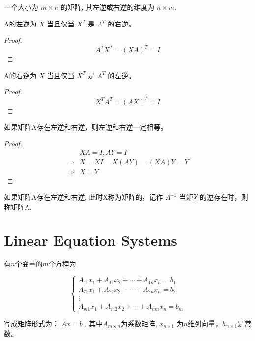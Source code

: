 \begin{theorem}
一个大小为 $ m \times n $ 的矩阵, 其左逆或右逆的维度为 $ n \times m $.
\end{theorem}


\begin{theorem}
    A的左逆为 $ X $ 当且仅当 $ X^{T} $ 是 $ A^{T} $ 的右逆。
\end{theorem}

\begin{proof}
    $$
A^{T} X^{T}=(X A)^{T}=I
$$
\end{proof}

\begin{theorem}
    A的右逆为 $ X $ 当且仅当 $ X^{T} $ 是 $ A^{T} $ 的左逆。
\end{theorem}

\begin{proof}
    $$
X^{T} A^{T}=(A X)^{ {T}}=I
$$
\end{proof}

\begin{theorem}
    如果矩阵A存在左逆和右逆，则左逆和右逆一定相等。
\end{theorem}

\begin{proof}
    $$
    \begin{aligned}
    &X A=I, A Y=I  \\
    \Rightarrow&  X=X I=X(A Y)=(X A) Y=Y \\
    \Rightarrow& X=Y
    \end{aligned}
$$
\end{proof}

\begin{definition}[逆 $A^{-1}$]
    如果矩阵A存在左逆和右逆, 此时X称为矩阵的，记作 $ A^{-1} $ 当矩阵的逆存在时，则称矩阵A.
\end{definition}

\section{Linear Equation Systems}

\begin{definition}
    有$n$个变量的$m$个方程为

    $$ \left\{\begin{array}{c}A_{11} x_{1}+A_{12} x_{2}+\cdots+A_{1 n} x_{n}=b_{1} \\ A_{21} x_{1}+A_{22} x_{2}+\cdots+A_{2 n} x_{n}=b_{2} \\ \vdots \\ A_{m 1} x_{1}+A_{m 2} x_{2}+\cdots+A_{m n} x_{n}=b_{m}\end{array}\right. $$

    写成矩阵形式为： $  {A} x= {b} $ . 其中$A_{m \times n}$为系数矩阵, $ x_{n \times 1} $ 为$n$维列向量，$b_{m \times 1}$是常数。 
\end{definition}

